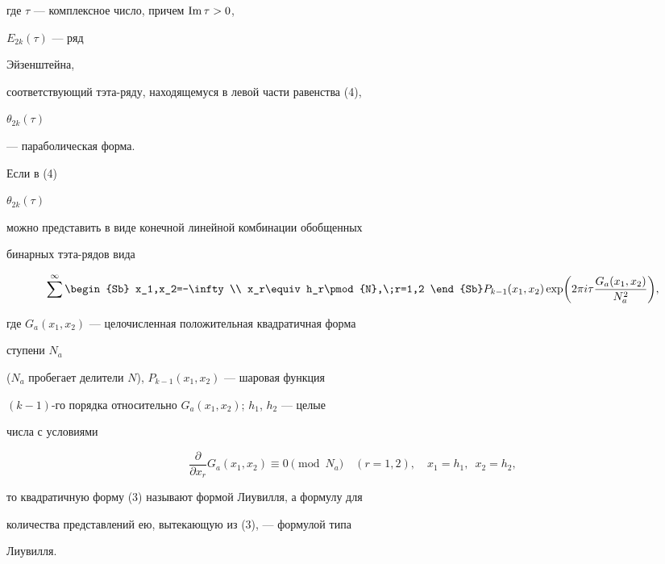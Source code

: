 где $\tau$ --- комплексное число, причем $\operatorname{Im}\tau>0$,


$E_{2k}(\tau)$ --- ряд


Эйзенштейна,


соответствующий тэта-ряду, находящемуся в левой части равенства (4),


$\theta_{2k}(\tau)$


--- параболическая форма.





\begin{defn} Если в (4)


$\theta_{2k}(\tau)$


можно представить в виде конечной линейной комбинации обобщенных


бинарных тэта-рядов вида


$$


\sum^\infty


\begin{Sb} x_1,x_2=-\infty \\


x_r\equiv h_r\pmod{N},\;r=1,2 \end{Sb}


P_{k-1}(x_1,x_2)\exp


\biggl(2\pi i\tau\frac{G_a(x_1,x_2)}{N^2_a} \biggr),


$$


где $G_a(x_1,x_2)$ --- целочисленная положительная квадратичная форма


ступени $N_a$


($N_a$ пробегает делители $N$), $P_{k-1}(x_1,x_2)$ --- шаровая функция


$(k-1)$-го порядка относительно $G_a(x_1,x_2)$; $h_1$, $h_2$ --- целые


числа с условиями


$$


\frac{\partial}{\partial x_r}G_a(x_1,x_2)


\equiv 0\pmod{N_a}\quad


(r=1,2),\quad x_1=h_1, \ \;x_2=h_2,


$$


то квадратичную форму (3) называют формой Лиувилля, а формулу для


количества представлений ею, вытекающую из (3), --- формулой типа


Лиувилля.


\end{defn}





